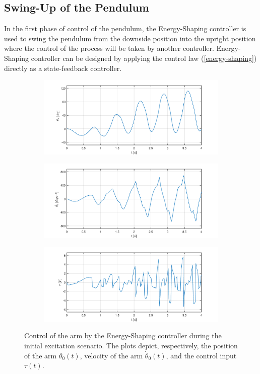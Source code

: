 \subsection{Swing-Up of the Pendulum}
In the first phase of control of the pendulum, the Energy-Shaping controller is used to swing the pendulum from the downside position into the upright position where the control of the process will be taken by another controller. 
Energy-Shaping controller can be designed by applying the control law (\ref{energy-shaping}) directly as a state-feedback controller.
\begin{figure}[H]
	\centering
\begin{subfigure}
	\centering
	\includegraphics[scale=0.6]{images/swings/arm.pdf}  
\end{subfigure}
\begin{subfigure}
	\centering
	\includegraphics[scale=0.6]{images/swings/darm.pdf}  
\end{subfigure}
\begin{subfigure}
	\centering
	\includegraphics[scale=0.6]{images/swings/control.pdf} 
\end{subfigure}
	\caption{Control of the arm by the Energy-Shaping controller during the initial excitation scenario. The plots depict, respectively, the position of the arm $\theta_0(t)$, velocity of the arm $\dot{\theta}_0(t)$, and the control input $\tau(t)$.}
\label{swing}
\end{figure}
